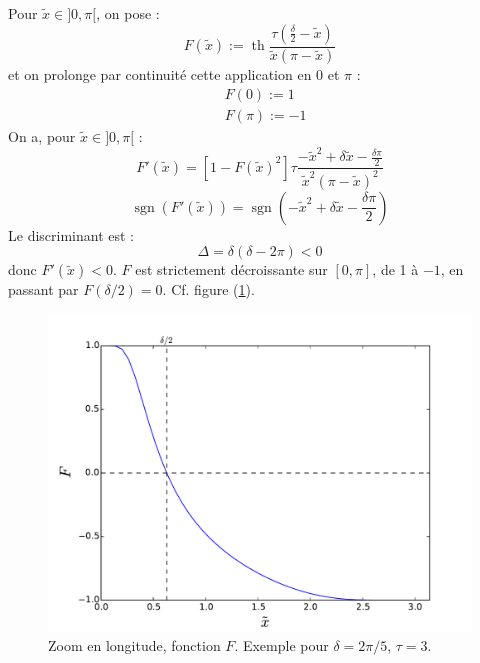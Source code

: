 \documentclass[a4paper,english,french]{article}
\DeclareMathOperator{\tgh}{th}
\DeclareMathOperator{\sgn}{sgn}
\begin{document}
Pour $\tilde x \in ]0, \pi[$, on pose :
\begin{equation*}
  F(\tilde x)
  := \tgh
  \frac
  {\tau \left(\frac{\delta}{2} - \tilde x \right)}{\tilde x (\pi - \tilde x)}
\end{equation*}
et on prolonge par continuité cette application en 0 et $\pi$ :
\begin{align*}
  & F(0) := 1 \\
  & F(\pi) := - 1
\end{align*}
On a, pour $\tilde x \in ]0, \pi[$ :
\begin{equation*}
  F'(\tilde x)
  =
  [1 - F(\tilde x)^2] \tau 
  \frac
  {- \tilde x^2 + \delta \tilde x - \frac{\delta \pi}{2}}
  {\tilde x^2 (\pi - \tilde x)^2}
\end{equation*}
\begin{equation*}
  \sgn(F'(\tilde x))
  = \sgn\left(- \tilde x^2 + \delta \tilde x - \frac{\delta \pi}{2} \right)
\end{equation*}
Le discriminant est :
\begin{equation*}
  \Delta = \delta (\delta - 2 \pi) < 0
\end{equation*}
donc $F'(\tilde x) < 0$. $F$ est strictement décroissante sur $[0,
\pi]$, de 1 à $- 1$, en passant par $F(\delta / 2) = 0$. Cf. figure
(\ref{fig:zoom_F}).
\begin{figure}
  \centering
  \includegraphics[width=\textwidth]{zoom_F}
  \caption[Zoom en longitude, fonction $F$]{Zoom en longitude,
    fonction $F$. Exemple pour $\delta = 2 \pi / 5$, $\tau = 3$.}
  \label{fig:zoom_F}
\end{figure}
\end{document}
